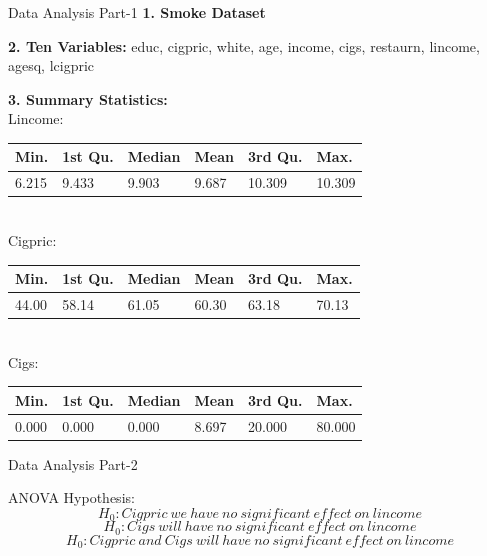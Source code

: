 \documentclass[aspectratio=169]{beamer}
\begin{document}
\begin{frame}{Data Analysis Part-1}
	\textbf{1. Smoke Dataset} 
	
	\textbf{2. Ten Variables:} educ, cigpric, white, age, income, cigs, restaurn, lincome, agesq, lcigpric  
	
	\textbf{3. Summary Statistics:}\\
	\textsf{Lincome:}
	\begin{tabular}{ | m{1.5cm} | m{1.5cm}| m{1.5cm} | m{1.5cm} |m{1.5cm} |m{1.5cm} | } 
		\hline
		Min. &  1st Qu. & Median & Mean & 3rd Qu. & Max. \\ 
		\hline
		6.215 & 9.433 & 9.903 & 9.687 & 10.309 & 10.309 \\
		\hline
	\end{tabular}\\
	\textsf{Cigpric:}
	\begin{tabular}{ | m{1.5cm} | m{1.5cm}| m{1.5cm} | m{1.5cm} |m{1.5cm} |m{1.5cm} | } 
		\hline
		Min. & 1st Qu. & Median & Mean & 3rd Qu. & Max. \\
		\hline 
		44.00 & 58.14 & 61.05 & 60.30 & 63.18 & 70.13 \\
		\hline
	\end{tabular}\\
	\textsf{Cigs:}
	\begin{tabular}{ | m{1.5cm} | m{1.5cm}| m{1.5cm} | m{1.5cm} |m{1.5cm} |m{1.5cm} | } 
		\hline
		Min. & 1st Qu. & Median & Mean & 3rd Qu. & Max. \\
		\hline 
		0.000 & 0.000 & 0.000 & 8.697 & 20.000 & 80.000 \\
		\hline
	\end{tabular}
\end{frame}
\begin{frame}{Data Analysis Part-2}
	
	\begin{center}
		ANOVA Hypothesis:
		\[ H_0: Cigpric \ we\ have\ no \ significant\ effect\ on\ lincome \]
		\[H_0: Cigs\ will\ have\ no\ significant\ effect\ on\ lincome\]
		\[H_0: Cigpric\ and\ Cigs\ will\ have\ no\ significant\ effect\ on\ lincome\] 
	\end{center}
	
\end{frame}
\end{document}
